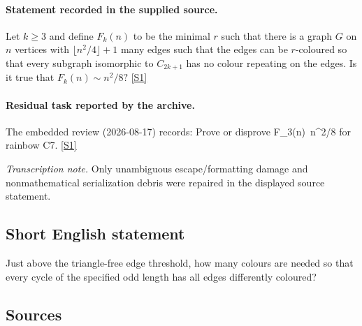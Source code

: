 \documentclass[11pt,a4paper]{article}
\newcommand{\sref}[2]{\hyperlink{source:#1:#2}{[S#2]}}
\begin{document}
\paragraph{Statement recorded in the supplied source.}
Let $k\geq 3$ and define $F_k(n)$ to be the minimal $r$ such that there is a graph $G$ on $n$ vertices with $\lfloor n^2/4\rfloor+1$ many edges such that the edges can be $r$-coloured so that every subgraph isomorphic to $C_{2k+1}$ has no colour repeating on the edges.
Is it true that $ F_k(n)\sim n^2/8? $ \sref{2314}{1}

\paragraph{Residual task reported by the archive.}

The embedded review (2026-08-17) records: Prove or disprove F\_3(n)~n\textasciicircum{}2/8 for rainbow C7. \sref{2314}{1}

{\small\emph{Transcription note.} Only unambiguous escape/formatting damage and nonmathematical serialization debris were repaired in the displayed source statement.}

\subsection{Short English statement}

Just above the triangle-free edge threshold, how many colours are needed so that every cycle of the specified odd length has all edges differently coloured?

\subsection{Sources}
\end{document}
